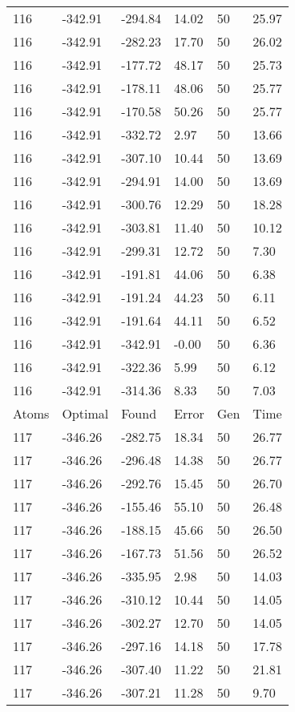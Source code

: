 \documentclass{report}
\begin{document}
\begin{appendix}
\begin{longtable}{llllll}
116 & -342.91 & -294.84 & 14.02 & 50 & 25.97 \\
116 & -342.91 & -282.23 & 17.70 & 50 & 26.02 \\
116 & -342.91 & -177.72 & 48.17 & 50 & 25.73 \\
116 & -342.91 & -178.11 & 48.06 & 50 & 25.77 \\
116 & -342.91 & -170.58 & 50.26 & 50 & 25.77 \\
116 & -342.91 & -332.72 & 2.97 & 50 & 13.66 \\
116 & -342.91 & -307.10 & 10.44 & 50 & 13.69 \\
116 & -342.91 & -294.91 & 14.00 & 50 & 13.69 \\
116 & -342.91 & -300.76 & 12.29 & 50 & 18.28 \\
116 & -342.91 & -303.81 & 11.40 & 50 & 10.12 \\
116 & -342.91 & -299.31 & 12.72 & 50 & 7.30 \\
116 & -342.91 & -191.81 & 44.06 & 50 & 6.38 \\
116 & -342.91 & -191.24 & 44.23 & 50 & 6.11 \\
116 & -342.91 & -191.64 & 44.11 & 50 & 6.52 \\
116 & -342.91 & -342.91 & -0.00 & 50 & 6.36 \\
116 & -342.91 & -322.36 & 5.99 & 50 & 6.12 \\
116 & -342.91 & -314.36 & 8.33 & 50 & 7.03 \\
Atoms & Optimal & Found & Error & Gen & Time \\
117 & -346.26 & -282.75 & 18.34 & 50 & 26.77 \\
117 & -346.26 & -296.48 & 14.38 & 50 & 26.77 \\
117 & -346.26 & -292.76 & 15.45 & 50 & 26.70 \\
117 & -346.26 & -155.46 & 55.10 & 50 & 26.48 \\
117 & -346.26 & -188.15 & 45.66 & 50 & 26.50 \\
117 & -346.26 & -167.73 & 51.56 & 50 & 26.52 \\
117 & -346.26 & -335.95 & 2.98 & 50 & 14.03 \\
117 & -346.26 & -310.12 & 10.44 & 50 & 14.05 \\
117 & -346.26 & -302.27 & 12.70 & 50 & 14.05 \\
117 & -346.26 & -297.16 & 14.18 & 50 & 17.78 \\
117 & -346.26 & -307.40 & 11.22 & 50 & 21.81 \\
117 & -346.26 & -307.21 & 11.28 & 50 & 9.70 \\

\end{longtable}
\end{appendix}
\end{document}

